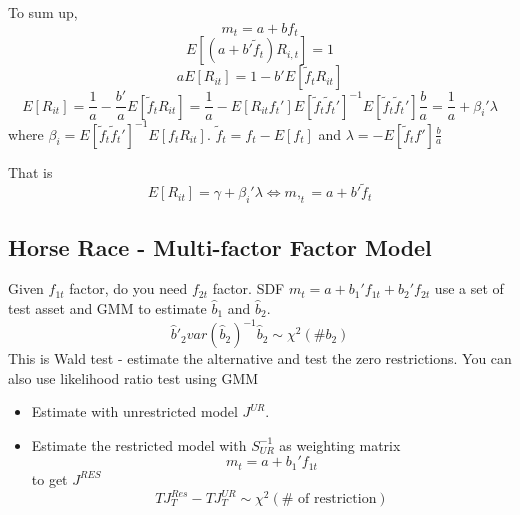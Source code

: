 \documentclass[11pt, a4paper, oneside]{article}
\theoremstyle{definition}
\theoremstyle{proposition}
\theoremstyle{corollary}
\theoremstyle{lemma}
\theoremstyle{theorem}
\begin{document}
To sum up, 
$$m_t = a + bf_t$$
$$E[(a+ b'\tilde{f}_t)R_{i, t}] = 1$$
$$a E[R_{it}] = 1 - b'E[\tilde{f}_tR_{it}]$$
$$E[R_{it}] = \frac{1}{a} - \frac{b'}{a}E[\tilde{f}_tR_{it}]=\frac{1}{a} -E[R_{it}f_t']E[\tilde{f}_t \tilde{f}_t']^{ -1}E[\tilde{f}_t\tilde{f}_t']\frac{b}{a} = \frac{1}{a}  + \beta_i'\lambda$$
where $\beta_i = E[\tilde{f}_t\tilde{f}_t']^{-1}E[f_tR_{it}]$.
$\tilde{f}_t = f_t - E[f_t]$ and $\lambda = -E[\tilde{f}_tf']\frac{b}{a}$

That is $$E[R_{it}]  = \gamma + \beta_i'\lambda \iff m,_t = a + b'\tilde{f}_t$$

\subsection{Horse Race - Multi-factor Factor Model}
Given $f_{1t}$ factor, do you need $f_{2t}$ factor. SDF $m_t = a +b_1'f_{1t} + b_2'f_{2t}$ use a set of test asset and GMM to estimate $\hat{b}_1$ and $\hat{b}_2$.
$$\hat{b}'_2var(\hat{b}_2)^{-1}\hat{b}_2 \sim \chi^2(\# b_2)$$
This is Wald test - estimate the alternative and test the zero restrictions. You can also use likelihood ratio test using GMM 
\begin{itemize}
\item Estimate with unrestricted model $J^{UR}$.  
\item Estimate the restricted model with $S^{-1}_{UR}$ as weighting matrix 
$$m_t = a + b_1'f_{1t}$$ to get $J^{RES}$
$$TJ_T^{Res} - T J_T^{UR} \sim \chi^2(\# \text{ of restriction})$$
\end{itemize}
\end{document}

